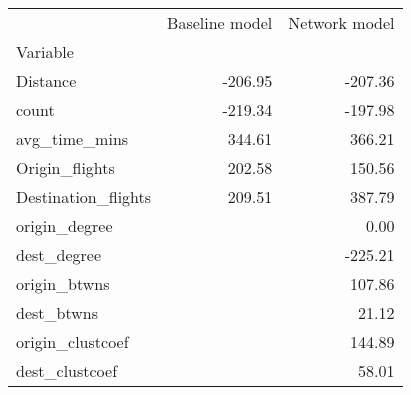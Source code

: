 \begin{tabular}{lrr}
\toprule
{} &  Baseline model &  Network model \\
Variable            &                 &                \\
\midrule
Distance            &         -206.95 &        -207.36 \\
count               &         -219.34 &        -197.98 \\
avg\_time\_mins       &          344.61 &         366.21 \\
Origin\_flights      &          202.58 &         150.56 \\
Destination\_flights &          209.51 &         387.79 \\
origin\_degree       &                 &           0.00 \\
dest\_degree         &                 &        -225.21 \\
origin\_btwns        &                 &         107.86 \\
dest\_btwns          &                 &          21.12 \\
origin\_clustcoef    &                 &         144.89 \\
dest\_clustcoef      &                 &          58.01 \\
\bottomrule
\end{tabular}
